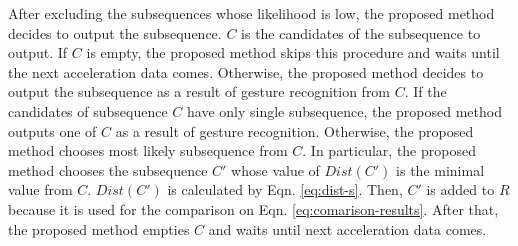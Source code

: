 \documentclass{sigchi-ext}
\begin{document}

        
        After excluding the subsequences whose likelihood is low, the proposed method decides to output the subsequence. $C$ is the candidates of the subsequence to output. If $C$ is empty, the proposed method skips this procedure and waits until the next acceleration data comes. Otherwise, the proposed method decides to output the subsequence as a result of gesture recognition from $C$.
        If the candidates of subsequence $C$ have only single subsequence, the proposed method outputs one of $C$ as a result of gesture recognition.
        Otherwise, the proposed method chooses most likely subsequence from $C$. In particular, the proposed method chooses the subsequence $ C' $ whose value of $Dist(C')$ is the minimal value from $C$. $Dist(C')$ is calculated by Eqn. \ref{eq:dist-s}. Then, $C'$ is added to $R$ because it is used for the comparison on Eqn. \ref{eq:comarison-results}.
        After that, the proposed method empties $C$ and waits until next acceleration data comes.
\end{document}
